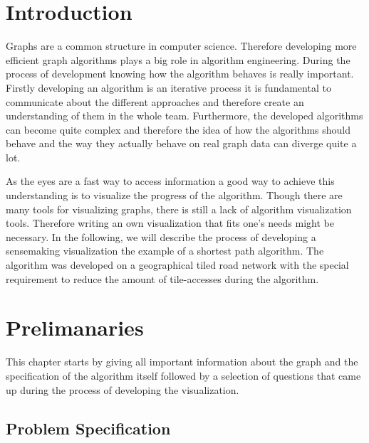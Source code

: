\documentclass
[
	paper = a4,
    pagesize,
	12 pt,
	oneside,                       %
    open = right,
	DIV = calc,
	BCOR = 0 mm,                   %
	bibtotoc
]
{scrbook}
\begin{document}
\frontmatter







\mainmatter
\chapter{Introduction} \label{introduction}
Graphs are a common structure in computer science.
Therefore developing more efficient graph algorithms plays a big role in algorithm engineering.
During the process of development knowing how the algorithm behaves is really important.
Firstly developing an algorithm is an iterative process it is fundamental to communicate about the different approaches and therefore create an understanding of them in the whole team.
Furthermore, the developed algorithms can become quite complex and therefore the idea of how the algorithms should behave and the way they actually behave on real graph data can diverge quite a lot.
\par
As the eyes are a fast way to access information a good way to achieve this understanding is to visualize the progress of the algorithm.
Though there are many tools for visualizing graphs, there is still a lack of algorithm visualization tools.
Therefore writing an own visualization that fits one's needs might be necessary.
In the following, we will describe the process of developing a sensemaking visualization the example of a shortest path algorithm. The algorithm was developed on a geographical tiled road network with the special requirement to reduce the amount of tile-accesses during the algorithm.

\chapter{Prelimanaries} \label{questions}

This chapter starts by giving all important information about the graph and the specification of the algorithm itself followed by a selection of questions that came up during the process of developing the visualization.


\section{Problem Specification} \label{specification}
\end{document}
